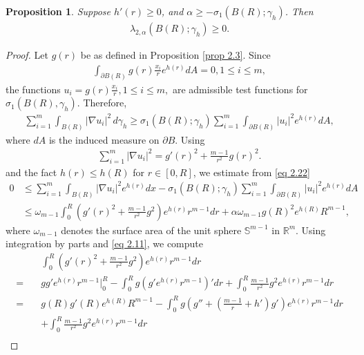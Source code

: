 \documentclass[11pt,leqno]{amsart}
\newtheorem{proposition}{Proposition}[section]
\def\a{\alpha}
\def\p{\partial}
\def\R{\mathbb{R}}
\def \p {\partial}
\numberwithin{equation}{section}
\begin{document}
\begin{proposition} \label{prop 2.4}
Suppose $h'(r)\ge 0$, and $\a\ge -\sigma_1(B(R); \gamma_h)$. Then
\begin{align*}
  \lambda_{2,\alpha}(B(R); \gamma_h)\geq 0.  
\end{align*}
\end{proposition}
\begin{proof}
    Let $g(r)$ be as defined in Proposition \ref{prop 2.3}.  
    Since 
    \begin{align*}
        \int_{\partial B(R)}g(r)\frac{x_{i}}{r}e^{h(r)}dA=0, 1\leq i\leq m,
    \end{align*}
    the functions $u_{i}=g(r)\frac{x_{i}}{r}, 1\leq i\leq m,$ are admissible test functions  for $\sigma_{1}(B(R), \gamma_h)$. Therefore,
    \begin{align}\label{eq 2.22}
        \sum_{i=1}^{m}\int_{B(R)}|\nabla u_{i}|^{2}\, d\gamma_h\geq \sigma_1(B(R); \gamma_h) \sum_{i=1}^{m}\int_{\partial B(R)}|u_{i}|^{2}e^{h(r)}dA,
    \end{align}
    where  $dA$ is  the induced measure on $\p B$.
Using 
    \begin{align*}
        \sum_{i=1}^{m}|\nabla u_{i}|^{2}=g'(r)^{2}+\frac{m-1}{r^{2}}g(r)^{2}.
    \end{align*}
    and the fact $h(r)\le h(R)$ for $r\in[0, R]$, we estimate from \ref{eq 2.22} 
    \begin{align}\label{eq 2.23}
        0&\leq \sum_{i=1}^{m}\int_{B(R)}|\nabla u_{i}|^{2}e^{h(r)}dx- \sigma_1(B(R); \gamma_h)\sum_{i=1}^{m}\int_{\partial B(R)}|u_{i}|^{2}e^{h(r)}dA\nonumber\\
        &\leq \omega_{m-1}\int_{0}^{R}\left(g'(r)^{2}+\frac{m-1}{r^{2}}g^{2}\right)e^{h(r)}r^{m-1}dr+\alpha \omega_{m-1} g(R)^{2}e^{h(R)}R^{m-1},
    \end{align}
    where $\omega_{m-1}$  denotes the surface area of the unit sphere $\mathbb{S}^{m-1}$ in $\R^m$.
Using integration by parts and \eqref{eq 2.11}, we compute 
\begin{align*}
    &\int_{0}^{R}\left(g'(r)^{2}+\frac{m-1}{r^{2}}g^{2}\right)e^{h(r)}r^{m-1}dr\\
    =\quad &gg'e^{h(r)}r^{m-1}\Big|_{0}^{R}-\int_{0}^{R}g(g'e^{h(r)}r^{m-1})'dr+\int_{0}^{R}\frac{m-1}{r^{2}}g^{2}e^{h(r)}r^{m-1}dr\\
    =\quad &g(R)g'(R)e^{h(R)}R^{m-1}-\int_{0}^{R}g(g''+(\frac{m-1}{r}+h')g')e^{h(r)}r^{m-1}dr\\
    &+\int_{0}^{R}\frac{m-1}{r^{2}}g^{2}e^{h(r)}r^{m-1}dr\\

\end{align*}
\end{proof}
\end{document}
